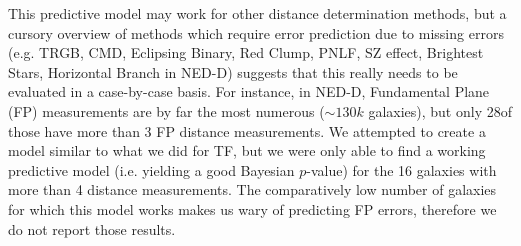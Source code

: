 \documentclass[a4paper,fleqn,usenatbib]{mnras}
\begin{document}
This predictive model may work for other distance determination methods, but a cursory overview of methods which require error prediction due to missing errors (e.g. TRGB, CMD, Eclipsing Binary, Red Clump, PNLF, SZ effect, Brightest Stars, Horizontal Branch in NED-D) suggests that this really needs to be evaluated in a case-by-case basis. For instance, in NED-D, Fundamental Plane (FP) measurements are by far the most numerous ($\sim130k$ galaxies), but only 28of those have more than 3 FP distance measurements. We attempted to create a model similar to what we did for TF, but we were only able to find a working predictive model (i.e. yielding a good Bayesian $p$-value) for the 16 galaxies with more than 4 distance measurements. The comparatively low number of galaxies for which this model works makes us wary of predicting FP errors, therefore we do not report those results.
\end{document}

